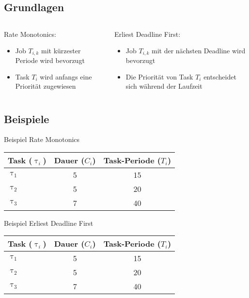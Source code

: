 \subsection{Grundlagen}
\begin{frame}{\subsecname}
		\begin{columns}[]
  			\begin{column}{0.5\textwidth}
				Rate Monotonics:
				\begin{itemize}
					\item Job $T_{i, k}$ mit kürzester Periode wird bevorzugt
					\item Task $T_i$ wird anfangs eine Priorität zugewiesen
				\end{itemize}

			\end{column}
  			\begin{column}{0.5\textwidth}
  				Erliest Deadline First:
				\begin{itemize}
					\item Job $T_{i, k}$ mit der nächsten Deadline wird bevorzugt
					\item Die Priorität von Task $T_i$ entscheidet sich während der Laufzeit
				\end{itemize}	
  			\end{column}
		\end{columns}
\end{frame}

\subsection{Beispiele}

\newcommand{\showRMSlide}[1] {\begin{frame}{Beispiel Rate Monotonics}
	\begin{center}
		\begin{tabular}{l||c|c}
				Task ($\uptau_i$) & Dauer ($C_i$) & Task-Periode ($T_i$)\\\hline\hline
				$\uptau_1$ & 5 & 15\\
				$\uptau_2$ & 5 & 20\\
				$\uptau_3$ & 7 & 40\\
		\end{tabular}
	\end{center}
	
\end{frame}}

%
{%
	\showRMSlide{\arabic{ct}}
}

\newcommand{\showEDFSlide}[1] {\begin{frame}{Beispiel Erliest Deadline First}
	\begin{center}
		\begin{tabular}{l||c|c}
				Task ($\uptau_i$) & Dauer ($C_i$) & Task-Periode ($T_i$)\\\hline\hline
				$\uptau_1$ & 5 & 15\\
				$\uptau_2$ & 5 & 20\\
				$\uptau_3$ & 7 & 40\\
		\end{tabular}
	\end{center}
	
\end{frame}}

%
{%
	\showEDFSlide{\arabic{ct}}
}